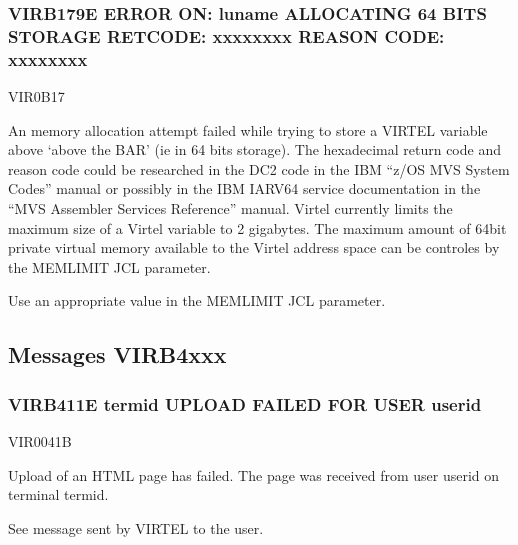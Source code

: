 \documentclass[letterpaper,10pt,english]{sphinxmanual}
\begin{document}
\subsubsection{VIRB179E ERROR ON: luname ALLOCATING 64 BITS STORAGE \sphinxhyphen{} RETCODE: xxxxxxxx \sphinxhyphen{} REASON CODE: xxxxxxxx}
\label{\detokenize{messages:virb179e-error-on-luname-allocating-64-bits-storage-retcode-xxxxxxxx-reason-code-xxxxxxxx}}\begin{description}
\sphinxAtStartPar
VIR0B17

\sphinxAtStartPar
An memory allocation attempt failed while trying to store a VIRTEL variable above ‘above the BAR’ (ie in 64 bits storage). The hexadecimal return code and reason code could be researched in the DC2 code in the IBM “z/OS   MVS System Codes” manual or possibly in the IBM IARV64 service documentation in the “MVS Assembler Services Reference” manual. Virtel currently limits the maximum size of a Virtel variable to 2 gigabytes. The maximum amount of 64\sphinxhyphen{}bit private virtual memory available to the Virtel address space can be controles by the MEMLIMIT JCL parameter.

\sphinxAtStartPar
Use an appropriate value in the MEMLIMIT JCL parameter.

\end{description}


\subsection{Messages VIRB4xxx}
\label{\detokenize{messages:messages-virb4xxx}}

\subsubsection{VIRB411E termid UPLOAD FAILED FOR USER userid}
\label{\detokenize{messages:virb411e-termid-upload-failed-for-user-userid}}\begin{description}
\sphinxAtStartPar
VIR0041B

\sphinxAtStartPar
Upload of an HTML page has failed. The page was received from user userid on terminal termid.

\sphinxAtStartPar
See message sent by VIRTEL to the user.

\end{description}
\end{document}
